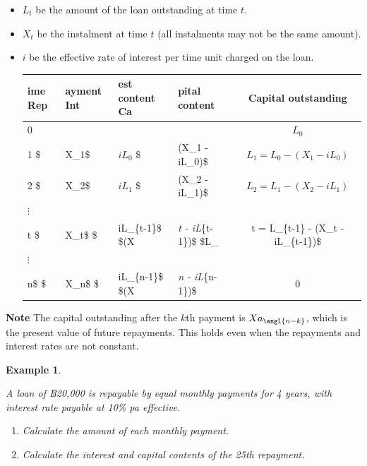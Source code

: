 \documentclass[landscape, 20pt]{extreport}
\theoremstyle{definition}
\theoremstyle{definition}
\newtheorem{example}{Example}[chapter]
\theoremstyle{definition}
\theoremstyle{definition}
\theoremstyle{remark}
\begin{document}
\begin{itemize}
\item
  \(L_t\) be the amount of the loan outstanding at time \(t\).
\item
  \(X_t\) be the instalment at time \(t\) (all instalments may not be the
  same amount).
\item
  \(i\) be the effective rate of interest per time unit charged on the
  loan.

  \begin{longtable}[]{@{}llllc@{}}
  \toprule
  ime Rep & ayment Int & est content Ca & pital content & Capital outstanding \\
  \midrule
  \endhead
  0 & & & & \(L_0\) \\
  1 \$ & X\_1\$ & \(iL_0\) \$ & (X\_1 - iL\_0)\$ & \(L_1 = L_0 - (X_1 - iL_0)\) \\
  2 \$ & X\_2\$ & \(iL_1\) \$ & (X\_2 - iL\_1)\$ & \(L_2 = L_1 - (X_2 - iL_1)\) \\
  \(\vdots\) & & & & \\
  t \$ & X\_t\$ \$ & iL\_\{t-1\}\$ \$(X & \emph{t - iL}\{t-1\})\$ \$L\_ & t = L\_\{t-1\} - (X\_t - iL\_\{t-1\})\$ \\
  \(\vdots\) & & & & \\
  n\$ \$ & X\_n\$ \$ & iL\_\{n-1\}\$ \$(X & \emph{n - iL}\{n-1\})\$ & 0 \\
  \bottomrule
  \end{longtable}
\end{itemize}

\textbf{Note} The capital outstanding after the \(k\)th payment is
\(X a_{\angl{n-k}}\), which is the present value of future repayments.
This holds even when the repayments and interest rates are not constant.

\newpage \begin{example}
\protect\hypertarget{exm:unlabeled-div-42}{}\label{exm:unlabeled-div-42}

\emph{A loan of ฿20,000 is repayable by equal monthly
payments for 4 years, with interest rate payable at 10\% pa effective.}

\begin{enumerate}
\def\labelenumi{\arabic{enumi}.}
\item
  \emph{Calculate the amount of each monthly payment.}
\item
  \emph{Calculate the interest and capital contents of the 25th repayment.}
\end{enumerate}

\end{example}
\end{document}
